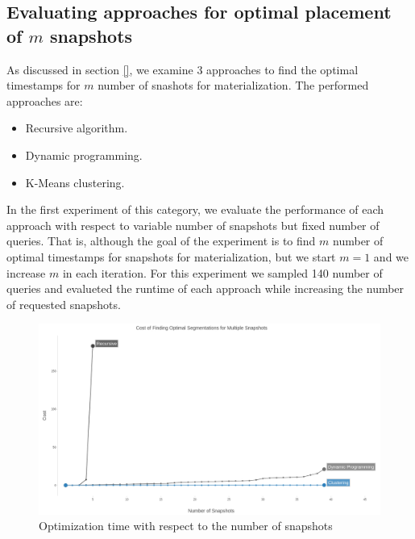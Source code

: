 		\subsection{Evaluating approaches for optimal placement of $m$ snapshots} \label{sec:evaluating_approaches}
			As discussed in section \ref{}, we examine 3 approaches to find the optimal timestamps for $m$ number of snashots for materialization. The performed approaches are:
			\begin{itemize}
				\item Recursive algorithm.
				\item Dynamic programming.
				\item K-Means clustering.
			\end{itemize}

			In the first experiment of this category, we evaluate the performance of each approach with respect to variable number of snapshots but fixed number of queries. That is, although the goal of the experiment is to find $m$ number of optimal timestamps for snapshots for materialization, but we start $m=1$ and we increase $m$ in each iteration. For this experiment we sampled 140 number of queries and evalueted the runtime of each approach while increasing the number of requested snapshots.

			\begin{figure}
				\centering
				\includegraphics[width=\textwidth]{figs/variable_snapshots.jpg}
				\caption{Optimization time with respect to the number of snapshots}
				\label{fig:variable_snapshots}
			\end{figure} 

